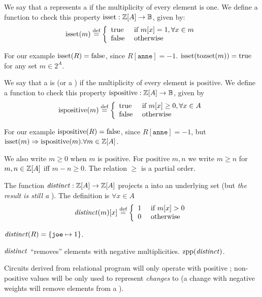 \begin{definition}
We say that a \zr represents a  if the multiplicity of every
element is one.  We define a function to check this property
$\mbox{isset} : \mathbb{Z}[A] \rightarrow \mathbb{B}$, given by:
$$\mbox{isset}(m) \stackrel{\textrm{\scriptsize def}}{=} \left\{
\begin{array}{ll}
  \mbox{true} & \mbox{ if } m[x] = 1, \forall x \in m \\
  \mbox{false} & \mbox{ otherwise}
\end{array}
\right.
$$
\end{definition}
For our example $\mbox{isset}(R) = \mbox{false}$, since $R[\texttt{anne}] = -1$.
$\mbox{isset}(\mbox{tozset}(m)) = \mbox{true}$ for any set $m \in 2^A$.

\begin{definition}
We say that a \zr is  (or a ) if the multiplicity of every element is
positive. We define a function to check this property
$\mbox{ispositive} : \mathbb{Z}[A] \rightarrow \mathbb{B}$, given by
$$\mbox{ispositive}(m) \stackrel{\textrm{\scriptsize def}}{=} \left\{
\begin{array}{ll}
  \mbox{true} & \mbox{ if } m[x] \geq 0, \forall x \in A \\
  \mbox{false} & \mbox{ otherwise}
\end{array}
\right.$$
\end{definition}
For our example $\mbox{ispositive}(R) = \mbox{false}$, since $R[\texttt{anne}] = -1$,
but $\mbox{isset}(m) \Rightarrow \mbox{ispositive}(m). \forall m \in \mathbb{Z}[A]$.

We also write $m \geq 0$ when $m$ is
positive.  For positive $m, n$ we write $m \geq n$ for $m, n
\in \mathbb{Z}[A]$ iff $m - n \geq 0$.  The relation $\geq$ is a partial order.

\begin{definition}
The function $\mathit{distinct}: \mathbb{Z}[A] \rightarrow \mathbb{Z}[A]$
projects a \zr into an underlying set (but \emph{the result is
  still a \zr}).  The definition is $\forall x \in A$
$$\mathit{distinct}(m)[x] \stackrel{\textrm{\scriptsize def}}{=} \left\{
\begin{array}{ll}
  1 & \mbox{ if } m[x] > 0 \\
  0 & \mbox{ otherwise}
\end{array}
\right.
$$
\end{definition}
$\mathit{distinct}(R) = \{ \texttt{joe} \mapsto 1 \}$.

$\mathit{distinct}$ ``removes'' elements with negative multiplicities.  $\mbox{zpp}(\mathit{distinct})$.

Circuits derived from relational program will only operate with positive \zrs;
non-positive values will be only used to represent \emph{changes} to \zrs
(a change with negative weights will remove elements from a \zr).

